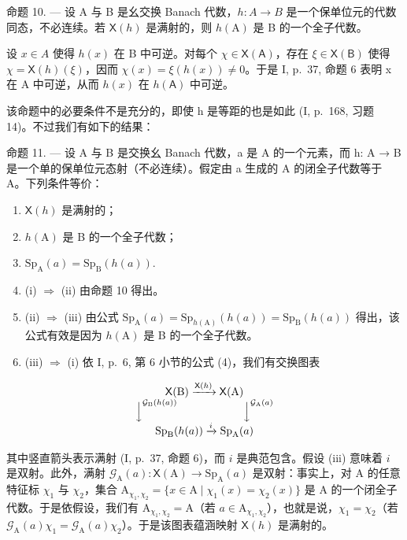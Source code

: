 命题 10. --- 设 A 与 B 是幺交换 Banach 代数，\(h\colon A\to B\) 是一个保单位元的代数同态，不必连续。若 \(\mathsf{X}(h)\) 是满射的，则 \(h(\mathrm{A})\) 是 B 的一个全子代数。

设 \(x \in A\) 使得 \(h(x)\) 在 B 中可逆。对每个 \(\chi \in \mathsf{X}(\mathsf{A})\)，存在 \(\xi \in \mathsf{X}(\mathsf{B})\) 使得 \(\chi = \mathsf{X}(h)(\xi)\)，因而 \(\chi(x) = \xi(h(x)) \neq 0\)。于是 I, p.~37, 命题 6 表明 x 在 A 中可逆，从而 \(h(x)\) 在 \(h(\mathsf{A})\) 中可逆。

该命题中的必要条件不是充分的，即使 h 是等距的也是如此 (I, p.~168, 习题 14)。不过我们有如下的结果：

命题 11. --- 设 A 与 B 是交换幺 Banach 代数，a 是 A 的一个元素，而 h: A → B 是一个单的保单位元态射（不必连续）。假定由 a 生成的 A 的闭全子代数等于 A。下列条件等价：

\begin{enumerate}
\def\labelenumi{(\roman{enumi})}
\item
  \(\mathsf{X}(h)\) 是满射的；
\item
  \(h(\mathrm{A})\) 是 B 的一个全子代数；
\item
  \(\mathrm{Sp}_{\mathrm{A}}(a)=\mathrm{Sp}_{\mathrm{B}}(h(a)).\)
\item
  (i) \(\Longrightarrow\) (ii) 由命题 10 得出。
\item
  (ii) \(\Longrightarrow\) (iii) 由公式 \(\mathrm{Sp}_{\mathrm{A}}(a) = \mathrm{Sp}_{h(\mathrm{A})}(h(a)) = \mathrm{Sp}_{\mathrm{B}}(h(a))\) 得出，该公式有效是因为 \(h(\mathrm{A})\) 是 B 的一个全子代数。
\item
  (iii) \(\Longrightarrow\) (i) 依 I, p.~6, 第 6 小节的公式 (4)，我们有交换图表
\end{enumerate}

\[
\begin{array}{c} \mathsf {X} (\mathrm{B}) \xrightarrow {\mathsf {X} (h)} \mathsf {X} (\mathrm{A}) \\ \Big \downarrow^ {\mathcal {G} _ {\mathrm{B}} (h (a))} \qquad \qquad \qquad \Big \downarrow^ {\mathcal {G} _ {\mathrm{A}} (a)} \\ \operatorname{Sp} _ {\mathrm{B}} (h (a)) \xrightarrow {i} \operatorname{Sp} _ {\mathrm{A}} (a) \end{array}
\]

其中竖直箭头表示满射 (I, p.~37, 命题 6)，而 \(i\) 是典范包含。假设 (iii) 意味着 \(i\) 是双射。此外，满射 \(\mathcal{G}_{\mathrm{A}}(a)\colon \mathsf{X}(\mathrm{A})\to \mathrm{Sp}_{\mathrm{A}}(a)\) 是双射：事实上，对 A 的任意特征标 \(\chi_{1}\) 与 \(\chi_{2}\)，集合 \(\mathrm{A}_{\chi_1,\chi_2} = \{x\in \mathrm{A}\mid \chi_1(x) = \chi_2(x)\}\) 是 A 的一个闭全子代数。于是依假设，我们有 \(\mathrm{A}_{\chi_1,\chi_2} = \mathrm{A}\)（若 \(a\in \mathrm{A}_{\chi_1,\chi_2}\)），也就是说，\(\chi_{1} = \chi_{2}\)（若 \(\mathcal{G}_{\mathrm{A}}(a)\chi_{1} = \mathcal{G}_{\mathrm{A}}(a)\chi_{2}\)）。于是该图表蕴涵映射 \(\mathsf{X}(h)\) 是满射的。

